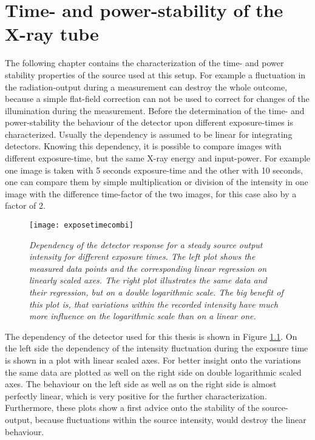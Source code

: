 \chapter[Time- Power-Stability]{Time- and power-stability of the X-ray tube}\label{chap:tps}
The following chapter contains the characterization of the time- and power stability properties of the source used at this setup. For example a fluctuation in the radiation-output during a measurement can destroy the whole outcome, because a simple flat-field correction can not be used to correct for changes of the illumination during the measurement. Before the determination of the time- and power-stability the behaviour of the detector upon different exposure-times is characterized. Usually the dependency is assumed to be linear for integrating detectors. Knowing this dependency, it is possible to compare images with different exposure-time, but the same X-ray energy and input-power. For example one image is taken with 5 seconds exposure-time and the other with 10 seconds, one can compare them by simple multiplication or division of the intensity in one image with the difference time-factor of the two images, for this case also by a factor of 2.
\vspace{.5cm}
\begin{figure}[h]
	\begin{center}
		\texttt{[image: exposetimecombi]}
	\end{center}
	\caption[Dependency of the detector response onto the exposure time]{\textit{Dependency of the detector response for a steady source output intensity for different exposure times. The left plot shows the measured data points and the corresponding linear regression on linearly scaled axes. The right plot illustrates the same data and their regression, but on a double logarithmic scale. The big benefit of this plot is, that variations within the recorded intensity have much more influence on the logarithmic scale than on a linear one.}}
	\label{exposetime}
\end{figure}
The dependency of the detector used for this thesis is shown in Figure \ref{exposetime}. On the left side the dependency of the intensity fluctuation during the exposure time is shown in a plot with linear scaled axes. For better insight onto the variations the same data are plotted as well on the right side on double logarithmic scaled axes. The behaviour on the left side as well as on the right side is almost perfectly linear, which is very positive for the further characterization. Furthermore, these plots show a first advice onto the stability of the source-output, because fluctuations within the source intensity, would destroy the linear behaviour.  
